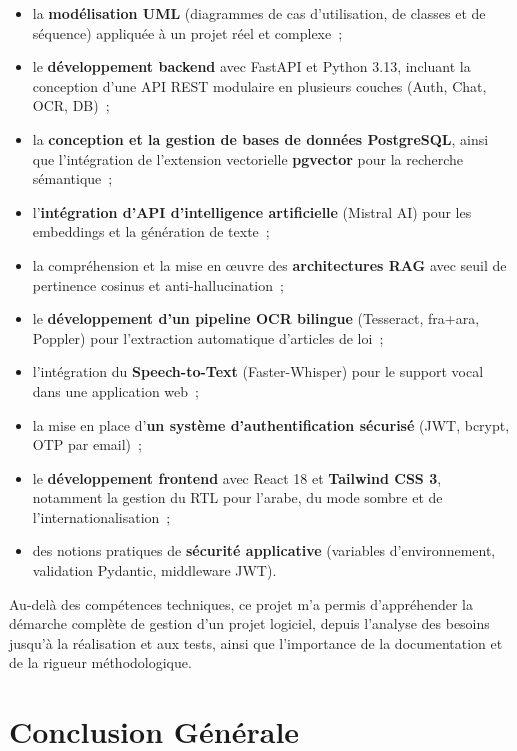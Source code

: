 \documentclass[12pt,a4paper]{report}
\begin{document}
\begin{itemize}[label=\textbullet]
    \item la \textbf{modélisation UML} (diagrammes de cas d'utilisation, de classes et de séquence) appliquée à un projet réel et complexe~;
    \item le \textbf{développement backend} avec FastAPI et Python 3.13, incluant la conception d'une API REST modulaire en plusieurs couches (Auth, Chat, OCR, DB)~;
    \item la \textbf{conception et la gestion de bases de données PostgreSQL}, ainsi que l'intégration de l'extension vectorielle \textbf{pgvector} pour la recherche sémantique~;
    \item l'\textbf{intégration d'API d'intelligence artificielle} (Mistral AI) pour les embeddings et la génération de texte~;
    \item la compréhension et la mise en œuvre des \textbf{architectures RAG} avec seuil de pertinence cosinus et anti-hallucination~;
    \item le \textbf{développement d'un pipeline OCR bilingue} (Tesseract, fra+ara, Poppler) pour l'extraction automatique d'articles de loi~;
    \item l'intégration du \textbf{Speech-to-Text} (Faster-Whisper) pour le support vocal dans une application web~;
    \item la mise en place d'\textbf{un système d'authentification sécurisé} (JWT, bcrypt, OTP par email)~;
    \item le \textbf{développement frontend} avec React 18 et \textbf{Tailwind CSS 3}, notamment la gestion du RTL pour l'arabe, du mode sombre et de l'internationalisation~;
    \item des notions pratiques de \textbf{sécurité applicative} (variables d'environnement, validation Pydantic, middleware JWT).
\end{itemize}

Au-delà des compétences techniques, ce projet m'a permis d'appréhender la démarche complète de gestion d'un projet logiciel, depuis l'analyse des besoins jusqu'à la réalisation et aux tests, ainsi que l'importance de la documentation et de la rigueur méthodologique.

\chapter*{Conclusion Générale}
\end{document}
